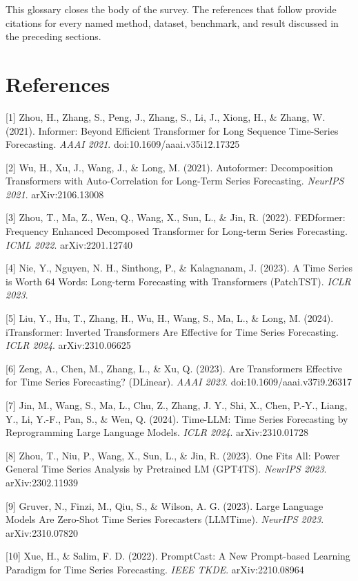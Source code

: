 This glossary closes the body of the survey. The references that follow provide citations for every named method, dataset, benchmark, and result discussed in the preceding sections.

\section{References}\label{references}

{[}1{]} Zhou, H., Zhang, S., Peng, J., Zhang, S., Li, J., Xiong, H., \& Zhang, W. (2021). Informer: Beyond Efficient Transformer for Long Sequence Time-Series Forecasting. \emph{AAAI 2021}. doi:10.1609/aaai.v35i12.17325

{[}2{]} Wu, H., Xu, J., Wang, J., \& Long, M. (2021). Autoformer: Decomposition Transformers with Auto-Correlation for Long-Term Series Forecasting. \emph{NeurIPS 2021}. arXiv:2106.13008

{[}3{]} Zhou, T., Ma, Z., Wen, Q., Wang, X., Sun, L., \& Jin, R. (2022). FEDformer: Frequency Enhanced Decomposed Transformer for Long-term Series Forecasting. \emph{ICML 2022}. arXiv:2201.12740

{[}4{]} Nie, Y., Nguyen, N. H., Sinthong, P., \& Kalagnanam, J. (2023). A Time Series is Worth 64 Words: Long-term Forecasting with Transformers (PatchTST). \emph{ICLR 2023}.

{[}5{]} Liu, Y., Hu, T., Zhang, H., Wu, H., Wang, S., Ma, L., \& Long, M. (2024). iTransformer: Inverted Transformers Are Effective for Time Series Forecasting. \emph{ICLR 2024}. arXiv:2310.06625

{[}6{]} Zeng, A., Chen, M., Zhang, L., \& Xu, Q. (2023). Are Transformers Effective for Time Series Forecasting? (DLinear). \emph{AAAI 2023}. doi:10.1609/aaai.v37i9.26317

{[}7{]} Jin, M., Wang, S., Ma, L., Chu, Z., Zhang, J. Y., Shi, X., Chen, P.-Y., Liang, Y., Li, Y.-F., Pan, S., \& Wen, Q. (2024). Time-LLM: Time Series Forecasting by Reprogramming Large Language Models. \emph{ICLR 2024}. arXiv:2310.01728

{[}8{]} Zhou, T., Niu, P., Wang, X., Sun, L., \& Jin, R. (2023). One Fits All: Power General Time Series Analysis by Pretrained LM (GPT4TS). \emph{NeurIPS 2023}. arXiv:2302.11939

{[}9{]} Gruver, N., Finzi, M., Qiu, S., \& Wilson, A. G. (2023). Large Language Models Are Zero-Shot Time Series Forecasters (LLMTime). \emph{NeurIPS 2023}. arXiv:2310.07820

{[}10{]} Xue, H., \& Salim, F. D. (2022). PromptCast: A New Prompt-based Learning Paradigm for Time Series Forecasting. \emph{IEEE TKDE}. arXiv:2210.08964

